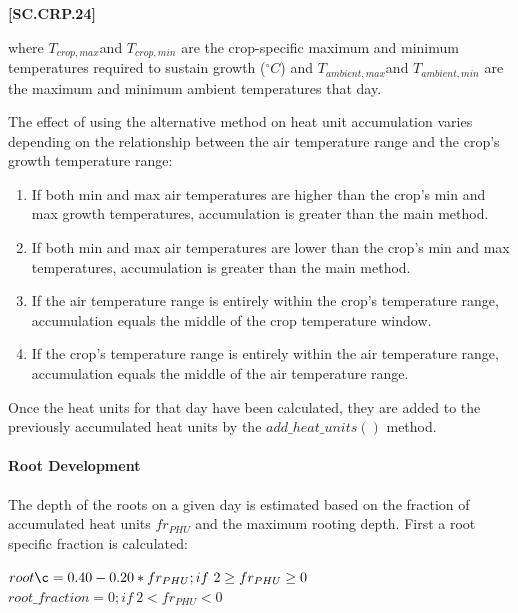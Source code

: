             {\raggedleft \textbf{[SC.CRP.24]}\par}
            \vspace{0.5cm}

where \(T_{crop,max}\)and \(T_{crop,min}\)	 are the crop-specific maximum and minimum temperatures required to sustain growth (\(^\circ C\)) and \(T_{ambient,max}\)and \(T_{ambient,min}\) are the maximum and minimum ambient temperatures that day.

The effect of using the alternative method on heat unit accumulation varies depending on the relationship between the air temperature range and the crop's growth temperature range:
\begin{enumerate}
    \item If both min and max air temperatures are higher than the crop's min and max growth temperatures, accumulation is greater than the main method.
    \item If both min and max air temperatures are lower than the crop's min and max temperatures, accumulation is greater than the main method.
     \item If the air temperature range is entirely within the crop's temperature range, accumulation equals the middle of the crop temperature window.
    \item If the crop's temperature range is entirely within the air temperature range, accumulation equals the middle of the air temperature range.

\end{enumerate}
Once the heat units for that day have been calculated, they are added to the previously accumulated heat units by the \(add\_heat\_units()\) method. 

\paragraph{Root Development}
\vspace{-0.25cm}

The depth of the roots on a given day is estimated based on the fraction of accumulated heat units \(fr_{PHU}\) and the maximum rooting depth. First a root specific fraction is calculated:
    \vspace{0.2cm}

    \begin{center}
        \(root\c = 0.40 - 0.20 * fr_{PHU} ; if\ 2 \geq fr_{PHU} \geq 0\)\\
        \(root\_fraction = 0; if\ 2 < fr_{PHU} < 0\)
    \end{center}
        \vspace{0.5cm}
    

